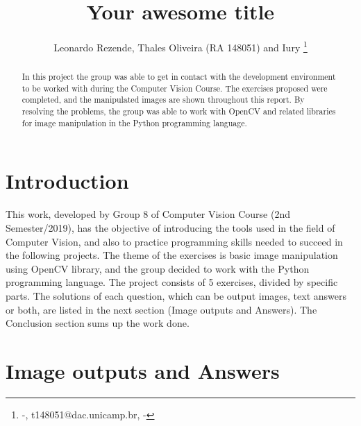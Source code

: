 \documentclass[]{IEEEtran}
\begin{document}
  \title{Your awesome title}
  \author{Leonardo Rezende, Thales Oliveira (RA 148051) and Iury 
    \thanks{-, t148051@dac.unicamp.br, -}
  }
  \maketitle
  
  \begin{abstract}
    In this project the group was able to get in contact with the development environment to be worked with during the Computer Vision Course. The exercises proposed were completed, and the manipulated images are shown throughout this report. By resolving the problems, the group was able to work with OpenCV and related libraries for image manipulation in the Python programming language.
  \end{abstract}
  
  \section{Introduction}
  
  This work, developed by Group 8 of Computer Vision Course (2nd Semester/2019), has the objective of introducing the tools used in the field of Computer Vision, and also to practice programming skills needed to succeed in the following projects. The theme of the exercises is basic image manipulation using OpenCV library, and the group decided to work with the Python programming language. The project consists of 5 exercises, divided by specific parts. The solutions of each question, which can be output images, text answers or both, are listed in the next section (Image outputs and Answers). The Conclusion section sums up the work done. 


  \section{Image outputs and Answers}
\end{document}
